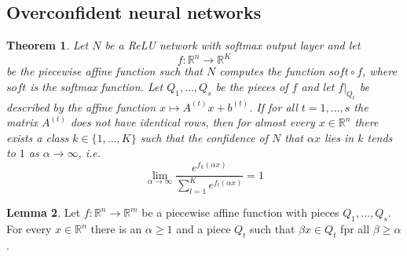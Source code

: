 \documentclass[a4paper, 12pt]{article}
\theoremstyle{plain}
\newtheorem{theorem}{Theorem}[subsection] %
\theoremstyle{definition}
\theoremstyle{lemma}
\newtheorem{lemma}[theorem]{Lemma}
\theoremstyle{remark}
\theoremstyle{example}
\begin{document}
	\subsection{Overconfident neural networks}
	\begin{theorem}
		Let $N$ be a ReLU network with softmax output layer and let \[f:\mathbb{R}^n \to \mathbb{R}^K\] be the piecewise affine function such that $N$ computes the function $soft\circ f$, where $soft$ is the softmax function. Let $Q_1,...,Q_s$ be the pieces of $f$ and let $f|_{Q_t}$ be described by the affine function $x \mapsto A^{(t)}x+b^{(t)}$. If for all $t=1,...,s$ the matrix $A^{(t)}$ does not have identical rows, then for almost every $x\in\mathbb{R}^n$ there exists a class $k\in \{1,...,K\}$ such that the confidence of $N$ that $\alpha x$ lies in $k$ tends to $1$ as $\alpha \to \infty$, i.e. \[\lim\limits_{\alpha \to \infty} \frac{e^{f_k(\alpha x)}}{\sum_{l=1}^{K} e^{f_l(\alpha x)}} = 1\]
	\end{theorem}
	\begin{lemma}
		Let $f: \mathbb{R}^n \to \mathbb{R}^m$ be a piecewise affine function with pieces $Q_1,...,Q_s.$ For every $x \in \mathbb{R}^n$ there is an $\alpha \geq 1$ and a piece $Q_t$ such that $\beta x \in Q_t$ fpr all $\beta \geq \alpha$.
	\end{lemma}
\end{document}
